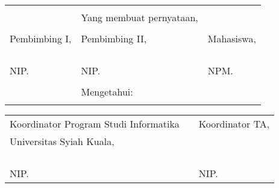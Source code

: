 \begin{singlespace}
\vspace{0.4cm}
{\renewcommand{\arraystretch}{0.8}
\centering
\begin{tabularx}{\textwidth}{l l p{6cm}} %
	&\tanggalSuratPernyataan		& \\
	&Yang membuat pernyataan,			& \\
	&&\\
	Pembimbing I,							&Pembimbing II,							&Mahasiswa,\\
	&&\\
	&&\\
	&&\\
	\underline{\pembimbingSatu}	&\underline{\pembimbingDua} &\underline{\penulis}\\
	NIP. \nipPembimbingSatu				&NIP. \nipPembimbingDua				&NPM. \npm \\
	&&\\
	&Mengetahui:\\			&
\end{tabularx}
}
{\renewcommand{\arraystretch}{0.8}
\begin{tabularx}{\textwidth}{llX} %
	Koordinator Program Studi Informatika	&\qquad\qquad  &Koordinator TA,\\
	Universitas Syiah Kuala,&\quad\quad  &\\
	&&\\
	&&\\
	&&\\
	\underline{\kaprodi}	&\quad\quad  &\underline{\koordinatorTA}\\
	NIP. \kaprodinip						&\quad\quad  &NIP. \koordinatorTAnip				
\end{tabularx}
}
\end{singlespace}